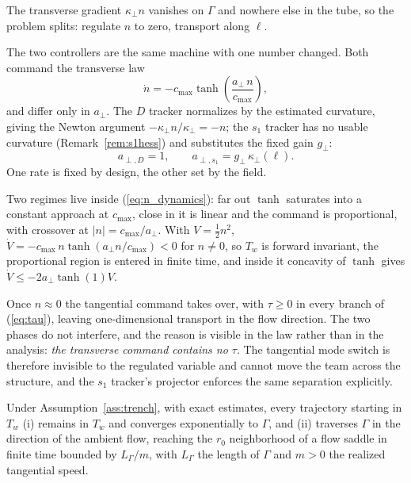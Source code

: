 The transverse gradient $\kappa_\perp n$ vanishes on $\Gamma$ and
nowhere else in the tube, so the problem splits: regulate $n$ to zero,
transport along $\ell$.

The two controllers are the same machine with one number changed. Both
command the transverse law
\begin{equation}
    \dot{n} = -c_{\max}\tanh\!\left(
        \frac{a_\perp\,n}{c_{\max}}\right),
    \label{eq:n_dynamics}
\end{equation}
and differ only in $a_\perp$. The $D$ tracker normalizes by the
estimated curvature, giving the Newton argument $-\kappa_\perp
n/\kappa_\perp = -n$; the $s_1$ tracker has no usable curvature
(Remark~\ref{rem:s1hess}) and substitutes the fixed gain $g_\perp$:
\begin{equation}
    a_{\perp,D} = 1,
    \qquad
    a_{\perp,s_1} = g_\perp\,\kappa_\perp(\ell).
    \label{eq:transverse_rates}
\end{equation}
One rate is fixed by design, the other set by the field.

Two regimes live inside (\ref{eq:n_dynamics}): far out $\tanh$ saturates
into a constant approach at $c_{\max}$, close in it is linear and the
command is proportional, with crossover at $|n| = c_{\max}/a_\perp$.
With $V = \tfrac{1}{2}n^2$, $\dot{V} = -c_{\max}\,n\tanh(a_\perp
n/c_{\max}) < 0$ for $n \neq 0$, so $T_w$ is forward invariant, the
proportional region is entered in finite time, and inside it concavity
of $\tanh$ gives $\dot{V} \leq -2a_\perp\tanh(1)V$.

Once $n \approx 0$ the tangential command takes over, with $\tau \geq 0$
in every branch of (\ref{eq:tau}), leaving one-dimensional transport in
the flow direction. The two phases do not interfere, and the reason is
visible in the law rather than in the analysis: \emph{the transverse
command contains no $\tau$}. The tangential mode switch is therefore
invisible to the regulated variable and cannot move the team across the
structure, and the $s_1$ tracker's projector enforces the same
separation explicitly.

\begin{theorem}
\label{thm:separatrix}
Under Assumption~\ref{ass:trench}, with exact estimates, every
trajectory starting in $T_w$ (i) remains in $T_w$ and converges
exponentially to $\Gamma$, and (ii) traverses $\Gamma$ in the direction
of the ambient flow, reaching the $r_0$ neighborhood of a flow saddle in
finite time bounded by $L_\Gamma/m$, with $L_\Gamma$ the length of
$\Gamma$ and $m > 0$ the realized tangential speed.
\end{theorem}

